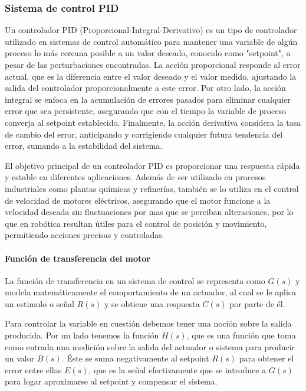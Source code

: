 \subsubsection{Sistema de control PID}
Un controlador PID (Proporcional-Integral-Derivativo) es un tipo de controlador utilizado en sistemas de control automático para mantener una variable de algún proceso lo más cercana posible a un valor deseado, conocido como "setpoint", a pesar de las perturbaciones encontradas. La acción proporcional responde al error actual, que es la diferencia entre el valor deseado y el valor medido, ajustando la salida del controlador proporcionalmente a este error. Por otro lado, la acción integral se enfoca en la acumulación de errores pasados para eliminar cualquier error que sea persistente, asegurando que con el tiempo la variable de proceso converja al setpoint establecido. Finalmente, la acción derivativa considera la tasa de cambio del error, anticipando y corrigiendo cualquier futura tendencia del error, sumando a la estabilidad del sistema.

El objetivo principal de un controlador PID es proporcionar una respuesta rápida y estable en diferentes aplicaciones. Además de ser utilizado en procesos industriales como plantas químicas y refinerías, también se lo utiliza en el control de velocidad de motores eléctricos, asegurando que el motor funcione a la velocidad deseada sin fluctuaciones por mas que se perciban alteraciones, por lo que en robótica resultan útiles para el control de posición y movimiento, permitiendo acciones precisas y controladas.

\paragraph{Función de transferencia del motor} \mbox{} \vspace{8pt}

La función de transferencia en un sistema de control se representa como $G(s)$ y modela matemáticamente el comportamiento de un actuador, al cual se le aplica un estimulo o señal $R(s)$ y se obtiene una respuesta $C(s)$ por parte de él.

Para controlar la variable en cuestión debemos tener una noción sobre la salida producida. Por un lado tenemos la función $H(s)$, que es una función que toma como entrada una medición sobre la salida del actuador o sistema para producir un valor $B(s)$. Éste se suma negativamente al setpoint $R(s)$ para obtener el error entre ellas $E(s)$, que es la señal efectivamente que se introduce a $G(s)$ para logar aproximarse al setpoint y compensar el sistema.

